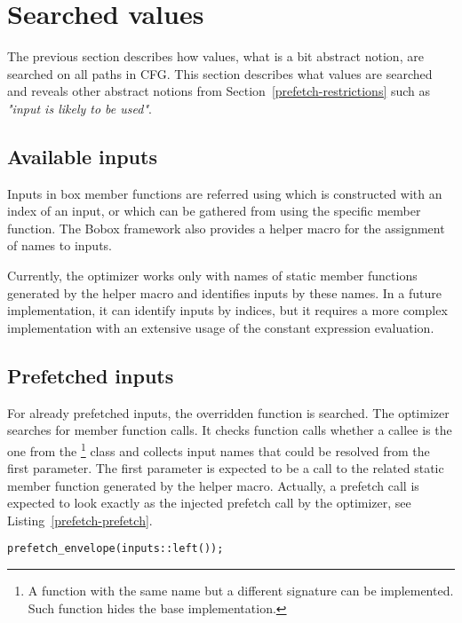 \section{Searched values}
The previous section describes how values, what is a bit abstract notion, are searched on all paths in CFG. This section describes what values are searched and reveals other abstract notions from Section~\ref{prefetch-restrictions} such as \textit{"input is likely to be used"}.

\subsection{Available inputs}
Inputs in box member functions are referred using  which is constructed with an index of an input, or  which can be gathered from  using the specific  member function. The Bobox framework also provides a helper macro for the assignment of names to inputs.

Currently, the optimizer works only with names of static member functions generated by the helper macro and identifies inputs by these names. In a future implementation, it can identify inputs by indices, but it requires a more complex implementation with an extensive usage of the constant expression evaluation.

\subsection{Prefetched inputs}
For already prefetched inputs, the overridden  function is searched. The optimizer searches for  member function calls. It checks function calls whether a callee is the one from the \footnote{A function with the same name but a different signature can be implemented. Such function hides the base implementation.} class and collects input names that could be resolved from the first parameter. The first parameter is expected to be a call to the related static member function generated by the helper macro. Actually, a prefetch call is expected to look exactly as the injected prefetch call by the optimizer, see Listing~\ref{prefetch-prefetch}.

\begin{lstlisting}[caption={An injected prefetch call for an input called \emph{left}.},label={prefetch-prefetch}]
prefetch_envelope(inputs::left());
\end{lstlisting}

